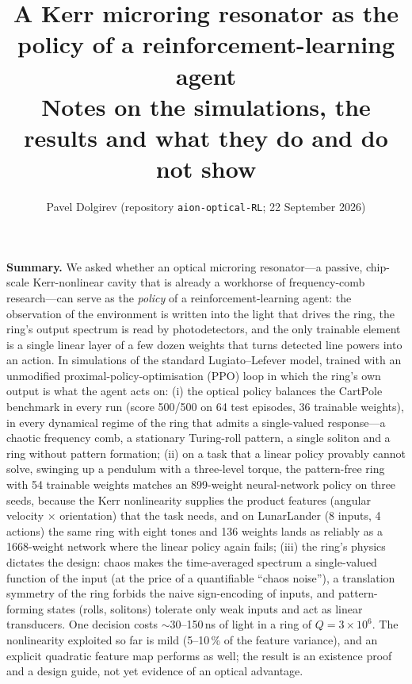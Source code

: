\documentclass[10pt,a4paper]{article}
\title{\vspace{-1.2cm}\Large\bfseries A Kerr microring resonator as the policy of a reinforcement-learning agent\\[2pt]
\normalsize\mdseries Notes on the simulations, the results and what they do and do not show}
\author{\normalsize Pavel Dolgirev \quad\textcolor{ink2}{\small (repository \texttt{aion-optical-RL}; 22 September 2026)}}
\date{}
\begin{document}
\maketitle
\vspace{-0.9cm}

\noindent\colorbox{boxbg}{\parbox{\dimexpr\textwidth-2\fboxsep}{\small
\textbf{Summary.}\; We asked whether an optical microring resonator---a passive, chip-scale Kerr-nonlinear cavity that is
already a workhorse of frequency-comb research---can serve as the \emph{policy} of a reinforcement-learning agent: the
observation of the environment is written into the light that drives the ring, the ring's output spectrum is read by
photodetectors, and the only trainable element is a single linear layer of a few dozen weights that turns detected line
powers into an action.  In simulations of the standard Lugiato--Lefever model, trained with an unmodified proximal-policy-optimisation
(PPO) loop in which the ring's own output is what the agent acts on:
(i) the optical policy balances the CartPole benchmark in every run (score 500/500 on 64 test episodes,
36 trainable weights), in every dynamical regime of the ring that admits a single-valued response---a chaotic frequency comb,
a stationary Turing-roll pattern, a single soliton and a ring without pattern formation; (ii) on a task that a linear policy provably cannot solve, swinging
up a pendulum with a three-level torque, the pattern-free ring with 54 trainable weights matches an
899-weight neural-network policy on three seeds, because the Kerr nonlinearity supplies the product features
(angular velocity $\times$ orientation) that the task needs, and on LunarLander (8 inputs, 4 actions) the same ring with
eight tones and 136 weights lands as reliably as a 1668-weight network where the linear policy again fails; (iii) the ring's physics dictates the design: chaos makes the
time-averaged spectrum a single-valued function of the input (at the price of a quantifiable ``chaos noise''), a
translation symmetry of the ring forbids the naive sign-encoding of inputs, and pattern-forming states (rolls, solitons)
tolerate only weak inputs and act as linear transducers.  One decision costs $\sim$30--150\,ns of light in a ring of
$Q = 3\times10^6$.  The nonlinearity exploited so far is mild (5--10\,\% of the feature variance), and an explicit quadratic
feature map performs as well; the result is an existence proof and a design guide, not yet evidence of an optical advantage.}}
\end{document}
